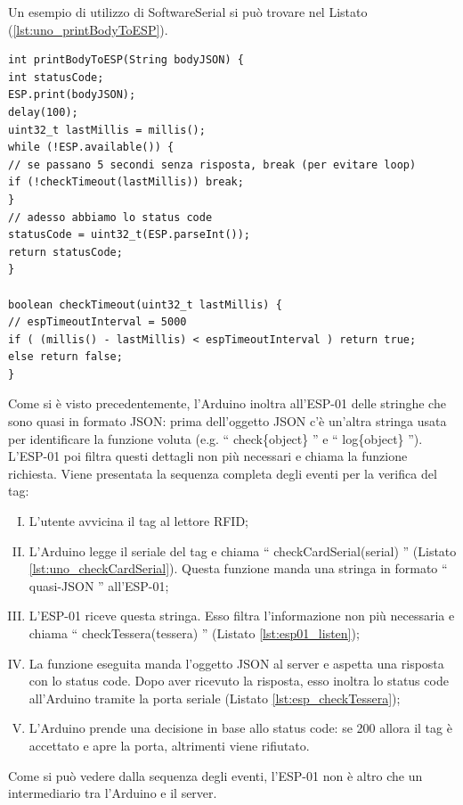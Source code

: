 \documentclass[12pt]{report}
\begin{document}
\noindent Un esempio di utilizzo di SoftwareSerial si può trovare nel Listato (\ref{lst:uno_printBodyToESP}).
\begin{lstlisting}[caption={La funzione printBodyToESP. Essa manda all'ESP-01 (tramite l'oggetto SoftwareSerial) la stringa ricevuta tra gli argomenti e poi aspetta per la risposta. Dopo aver ricevuto la risposta restituisce statusCode.}, label={lst:uno_printBodyToESP}]
int printBodyToESP(String bodyJSON) {
int statusCode;
ESP.print(bodyJSON);
delay(100);
uint32_t lastMillis = millis();
while (!ESP.available()) {
// se passano 5 secondi senza risposta, break (per evitare loop)
if (!checkTimeout(lastMillis)) break;
}
// adesso abbiamo lo status code
statusCode = uint32_t(ESP.parseInt());
return statusCode;
}

boolean checkTimeout(uint32_t lastMillis) {
// espTimeoutInterval = 5000
if ( (millis() - lastMillis) < espTimeoutInterval ) return true;
else return false;
}
\end{lstlisting}

Come si è visto precedentemente, l'Arduino inoltra all'ESP-01 delle stringhe che sono quasi in formato JSON: prima dell'oggetto JSON c'è un'altra stringa usata per identificare la funzione voluta (e.g$.$ \textquotedblleft{} check\{object\} \textquotedblright{} e \textquotedblleft{} log\{object\} \textquotedblright{}). L'ESP-01 poi filtra questi dettagli non più necessari e chiama la funzione richiesta.
 Viene presentata la sequenza completa degli eventi per la verifica del tag:

\begin{enumerate}[(I)]
	\item L'utente avvicina il tag al lettore RFID;
	\item L'Arduino legge il seriale del tag e chiama \textquotedblleft{} checkCardSerial(serial) \textquotedblright{} (Listato \ref{lst:uno_checkCardSerial}). Questa funzione manda una stringa in formato \textquotedblleft{} quasi-JSON \textquotedblright{} all'ESP-01;
	\item L'ESP-01 riceve questa stringa. Esso filtra l'informazione non più necessaria e chiama \textquotedblleft{} checkTessera(tessera) \textquotedblright{} (Listato \ref{lst:esp01_listen});
	\item La funzione eseguita manda l'oggetto JSON al server e aspetta una risposta con lo status code. Dopo aver ricevuto la risposta, esso inoltra lo status code all'Arduino tramite la porta seriale (Listato \ref{lst:esp_checkTessera});
	\item L'Arduino prende una decisione in base allo status code: se 200 allora il tag è accettato e apre la porta, altrimenti viene rifiutato.
\end{enumerate}
Come si può vedere dalla sequenza degli eventi, l'ESP-01 non è altro che un intermediario tra l'Arduino e il server.
%
\end{document}
